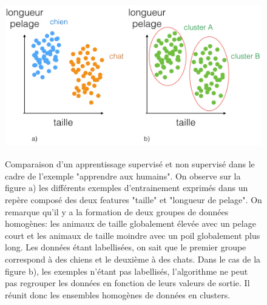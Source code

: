 \begin{figure}[H]
	\centering\includegraphics[height=7cm]{images/apprentissage_chat.jpeg}
	\caption[Comparaison d'un apprentissage supervisé et non supervisé dans le cadre de l'exemple "apprendre aux humains"]{Comparaison d'un apprentissage supervisé et non supervisé dans le cadre de l'exemple "apprendre aux humains". On observe sur la figure a) les différents exemples d'entrainement exprimés dans un repère composé des deux features "taille" et "longueur de pelage". On remarque qu'il y a la formation de deux groupes de données homogènes: les animaux de taille globalement élevée avec un pelage court et les animaux de taille moindre avec un poil globalement plus long. Les données étant labellisées, on sait que le premier groupe correspond à des chiens et le deuxième à des chats. Dans le cas de la figure b), les exemples n'étant pas labellisés, l'algorithme ne peut pas regrouper les données en fonction de leurs valeurs de sortie. Il réunit donc les ensembles homogènes de données en clusters.}
	\label{fig:Comparaison d'un apprentissage supervisé et non supervisé dans le cadre de l'exemple "apprendre aux humains"}
\end{figure}

